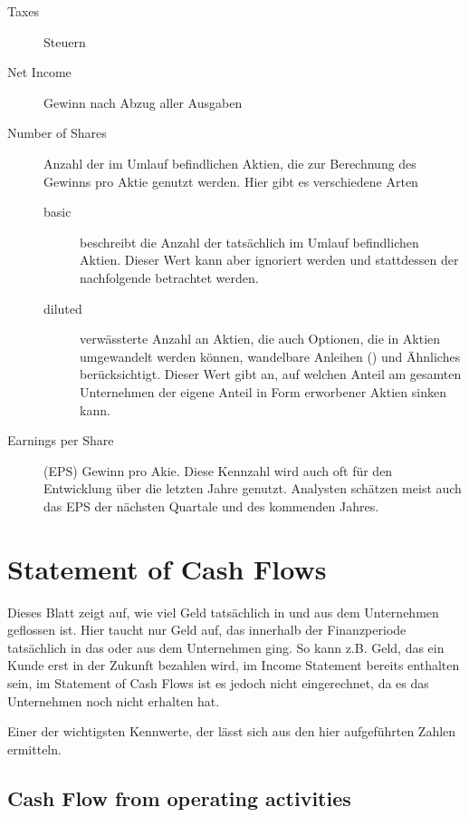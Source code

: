 \begin{description}
    \item[Taxes] Steuern
    \item[Net Income] Gewinn nach Abzug aller Ausgaben
    \item[Number of Shares] Anzahl der im Umlauf befindlichen Aktien, die zur Berechnung des Gewinns pro Aktie genutzt werden.
        Hier gibt es verschiedene Arten
        \begin{description}
            \item[basic] beschreibt die Anzahl der tatsächlich im Umlauf befindlichen Aktien. Dieser Wert kann aber ignoriert werden und stattdessen der nachfolgende betrachtet werden.
            \item[diluted] verwässterte Anzahl an Aktien, die auch Optionen, die in Aktien umgewandelt werden können, wandelbare Anleihen () und Ähnliches berücksichtigt.
                Dieser Wert gibt an, auf welchen Anteil am gesamten Unternehmen der eigene Anteil in Form erworbener Aktien sinken kann. 
        \end{description}
    \item[Earnings per Share] (EPS) Gewinn pro Akie. Diese Kennzahl wird auch oft für den Entwicklung über die letzten Jahre genutzt. 
        Analysten schätzen meist auch das EPS der nächsten Quartale und des kommenden Jahres.  
\end{description}


%
\section{Statement of Cash Flows}
Dieses Blatt zeigt auf, wie viel Geld tatsächlich in und aus dem Unternehmen geflossen ist.
Hier taucht nur Geld auf, das innerhalb der Finanzperiode tatsächlich in das oder aus dem Unternehmen ging.
So kann z.B. Geld, das ein Kunde erst in der Zukunft bezahlen wird, im Income Statement bereits enthalten sein, im Statement of Cash Flows ist es jedoch nicht eingerechnet, da es das Unternehmen noch nicht erhalten hat.

Einer der wichtigsten Kennwerte, der \freeCashFlow lässt sich aus den hier aufgeführten Zahlen ermitteln.

%
\subsection{Cash Flow from operating activities}

